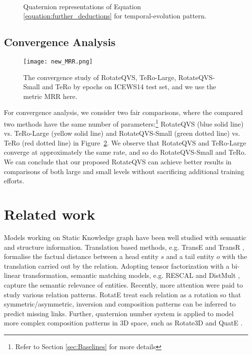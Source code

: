 \documentclass[11pt]{article}
\newcommand{\vect}[1]{\mathbf{#1}\xspace}
\begin{document}
\begin{figure}[!t]
  \centering
    \subfigure[$Re(\vect{r_1}) - Re(\vect{r_2}) = \vect{0}$]{\texttt{[image: temporal\_real.png]}} 
	\subfigure[$\vert \vert\vect{r_1}\vert \vert - \vert \vert \vect{r_2}\vert \vert = \vect{0}$]{\texttt{[image: temporal\_mo.png]}} \\
  \caption{Quaternion representations of Equation \ref{equation:further_deductions} for temporal-evolution pattern.}
  \label{figure:tp_deduction}
\end{figure}


\subsection{Convergence Analysis}
\begin{figure}[t!]
\centering
\texttt{[image: new\_MRR.png]} 
\caption{The convergence study of RotateQVS, TeRo-Large, RotateQVS-Small and TeRo by epochs on ICEWS14 test set, and we use the metric MRR here.}
\label{figure:convergence}
\vspace{-0.1in}
\end{figure}

For convergence analysis, we consider two fair comparisons, where the compared two methods have the same number of parameters:\footnote{Refer to Section \ref{sec:Baselines} for more details} RotateQVS (\textcolor{myblue}{blue solid} line) vs. TeRo-Large (\textcolor{myyellow}{yellow solid} line) and RotateQVS-Small (\textcolor{mygreen}{green dotted} line) vs. TeRo (\textcolor{myred}{red dotted} line) in Figure~\ref{figure:convergence}.
We observe that RotateQVS and TeRo-Large converge at approximately the same rate, and so do RotateQVS-Small and TeRo.
We can conclude that our proposed RotateQVS can achieve better results in comparisons of both large and small levels without sacrificing additional training efforts.



\section{Related work}


Models working on Static Knowledge graph have been well studied \cite{crosse,XuRKKA20,MaoWXLW20,BISC} with semantic and structure information. Translation based methods, e.g. TransE \cite{bordes2013translating} and TransR \cite{linlearning}, formalise the factual distance between a head entity $s$ and a tail entity $o$ with the translation carried out by the relation. Adopting tensor factorization with a bi-linear transformation, semantic matching models, e.g. RESCAL \cite{nickel2013tensor} and DistMult \cite{Yang2015EmbeddingEA}, capture the semantic relevance of entities. Recently, more attention were paid to study various relation patterns. RotatE \cite{SunDNT19} treat each relation as a rotation so that symmetric/asymmetric, inversion and composition patterns can be inferred to predict missing links. Further, quaternion number system \cite{Hamilton1844} is applied to model more complex composition patterns in 3D space, such as Rotate3D \cite{gao2020rotate3d} and QuatE \cite{zhang2019quaternion}.
\end{document}
